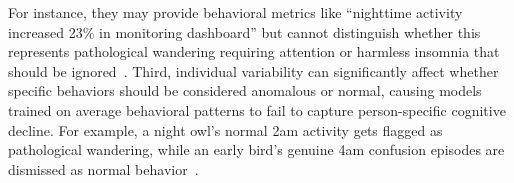 \documentclass[sigconf, anonymous, 9pt, nonacm]{acmart}
\begin{document}
For instance, they may provide behavioral metrics like ``nighttime activity increased 23\% in monitoring dashboard'' but cannot distinguish whether this represents pathological wandering requiring attention or harmless insomnia that should be ignored~\cite{kamil2021detection}. 
Third, individual variability can significantly affect whether specific behaviors should be considered anomalous or normal, causing models trained on average behavioral patterns to fail to capture person-specific cognitive decline. 
For example, a night owl's normal 2am activity gets flagged as pathological wandering, while an early bird's genuine 4am confusion episodes are dismissed as normal behavior~\cite{populationdigitalhealth, peterson2017personalized}. 

\end{document}
